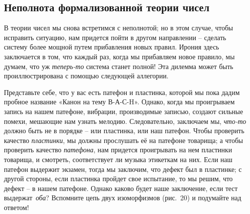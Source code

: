 \documentclass[../main.tex]{subfiles}
\begin{document}
\subsection{Неполнота формализованной теории чисел}

В теории чисел мы снова встретимся с неполнотой; но в этом случае, чтобы исправить ситуацию, нам придется пойти в другом направлении \--- сделать систему более мощной путем прибавления новых правил. Ирония здесь заключается в том, что каждый раз, когда мы прибавляем новое правило, мы думаем, что уж \emph{теперь-то} система станет полной! Эта дилемма может быть проиллюстрирована с помощью следующей аллегории.

Представьте себе, что у вас есть патефон и пластинка, которой мы пока дадим пробное название «Канон на тему \mbox{В-А-С-H}». Однако, когда мы проигрываем запись на нашем патефоне, вибрации, производимые записью, создают сильные помехи, мешающие нам узнать мелодию. Следовательно, заключаем мы, \emph{что-то} должно быть не в порядке \--- или пластинка, или наш патефон. Чтобы проверить качество \emph{пластинки}, мы должны прослушать её на патефоне товарища; а чтобы проверить качество \emph{патефона}, нам придется проигрывать на нем пластинки товарища, и смотреть, соответствует ли музыка этикеткам на них. Если наш патефон выдержит экзамен, тогда мы заключим, что дефект был в пластинке; с другой стороны, если пластинка пройдет свое испытание, то мы решим, что дефект \--- в нашем патефоне. Однако каково будет наше заключение, если тест выдержат~\emph{оба}?
Вспомните цепь двух изоморфизмов (рис.~20) и подумайте над ответом!
\end{document}

